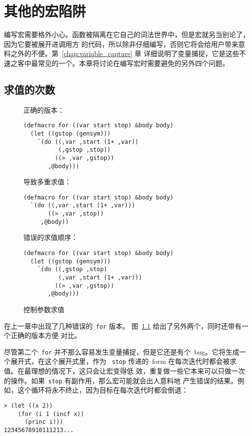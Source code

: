 
\chapter{其他的宏陷阱}
\label{chap:other_macro_pitfalls}

编写宏需要格外小心。函数被隔离在它自己的词法世界中，但是宏就另当别论了，因为它要被展开进调用方
的代码，所以除非仔细编写，否则它将会给用户带来意料之外的不便。第~\ref{chap:variable_capture} 章
详细说明了变量捕捉，它是这些不速之客中最常见的一个。本章将讨论在编写宏时需要避免的另外四个问题。

\section{求值的次数}
\label{sec:number_of_evaluations}

\begin{figure}
正确的版本：
\begin{lstlisting}
(defmacro for ((var start stop) &body body)
  (let ((gstop (gensym)))
    `(do ((,var ,start (1+ ,var))
          (,gstop ,stop))
         ((> ,var ,gstop))
       ,@body)))
\end{lstlisting}
导致多重求值：
\begin{lstlisting}
(defmacro for ((var start stop) &body body)
  `(do ((,var ,start (1+ ,var)))
       ((> ,var ,stop))
     ,@body))
\end{lstlisting}
错误的求值顺序：
\begin{lstlisting}
(defmacro for ((var start stop) &body body)
  (let ((gstop (gensym)))
    `(do ((,gstop ,stop)
          (,var ,start (1+ ,var)))
         ((> ,var ,gstop))
       ,@body)))
\end{lstlisting}
\caption{\label{fig:controlling_argument_evaluation}控制参数求值}
\end{figure}

在上一章中出现了几种错误的~\texttt{for} 版本。
图~\ref{fig:controlling_argument_evaluation} 给出了另外两个，同时还带有一个正确的版本方便
对比。

尽管第二个~\texttt{for} 并不那么容易发生变量捕捉，但是它还是有个~bug。它将生成一个展开式，在这个展开式里，作为
~\texttt{stop} 传递的~form 在每次迭代时都会被求值。在最理想的情况下，这只会让宏变得低
效，重复做一些它本来可以只做一次的操作。如果~\texttt{stop} 有副作用，那么宏可能就会出人意料地
产生错误的结果。例如，这个循环将永不终止，因为目标在每次迭代时都会倒退：
\begin{lstlisting}
> (let ((x 2))
    (for (i 1 (incf x))
      (princ i)))
12345678910111213...
\end{lstlisting}

